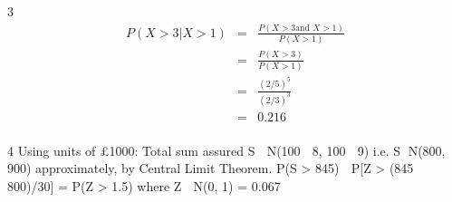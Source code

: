 \documentclass[a4paper,12pt]{article}
\begin{document}
3 
\begin{eqnarray*}
P(X > 3| X > 1) &=& \frac{P(X > 3 \mbox{and }X > 1)}{P(X > 1)}\\
&=& \frac{P(X > 3 )}{P(X > 1)}\\
&=& \frac{(2/5)^5 }{(2/3)^3 }\\
&=& 0.216\\
\end{eqnarray*}

4 Using units of £1000:
Total sum assured S  N(100  8, 100  9) i.e. S  N(800, 900) approximately, by
Central Limit Theorem.
P(S > 845)  P[Z > (845  800)/30] = P(Z > 1.5) where Z  N(0, 1)
= 0.067
\end{document}
